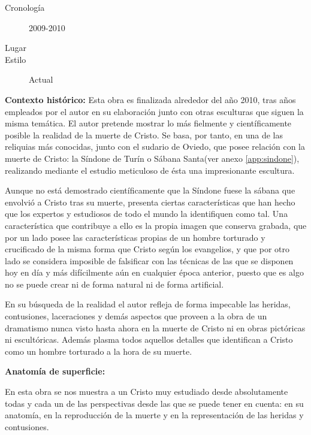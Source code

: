 \newpage

\begin{description}
\item[Cronología] 2009-2010
\item[Lugar]
\item[Estilo] Actual
\end{description}

\textbf{Contexto histórico:} Esta obra es finalizada alrededor del año 2010, tras años empleados por el autor en su elaboración junto con otras esculturas que siguen la misma temática. El autor pretende mostrar lo más fielmente y científicamente posible la realidad de la muerte de Cristo. Se basa, por tanto, en una de las reliquias más conocidas, junto con el sudario de Oviedo, que posee relación con la muerte de Cristo: la Síndone de Turín o Sábana Santa(ver anexo \autoref{app:sindone}), realizando mediante el estudio meticuloso de ésta una impresionante escultura.

Aunque no está demostrado científicamente que la Síndone fuese la sábana que envolvió a Cristo tras su muerte, presenta ciertas características que han hecho que los expertos y estudiosos de todo el mundo la identifiquen como tal. Una característica que contribuye a ello es la propia imagen que conserva grabada, que por un lado posee las características propias de un hombre torturado y crucificado de la misma forma que Cristo según los evangelios, y que por otro lado se considera imposible de falsificar con las técnicas de las que se disponen hoy en día y más difícilmente aún en cualquier época anterior, puesto que es algo no se puede crear ni de forma natural ni de forma artificial.

En su búsqueda de la realidad el autor refleja de forma impecable las heridas, contusiones, laceraciones y demás aspectos que proveen a la obra de un dramatismo nunca visto hasta ahora en la muerte de Cristo ni en obras pictóricas ni escultóricas. Además plasma todos aquellos detalles que identifican a Cristo como un hombre torturado a la hora de su muerte.

\vspace{12pt}
\textbf{Anatomía de superficie:}

En esta obra se nos muestra a un Cristo muy estudiado desde absolutamente todas y cada un de las perspectivas desde las que se puede tener en cuenta: en su anatomía, en la reproducción de la muerte y en la representación de las heridas y contusiones.

